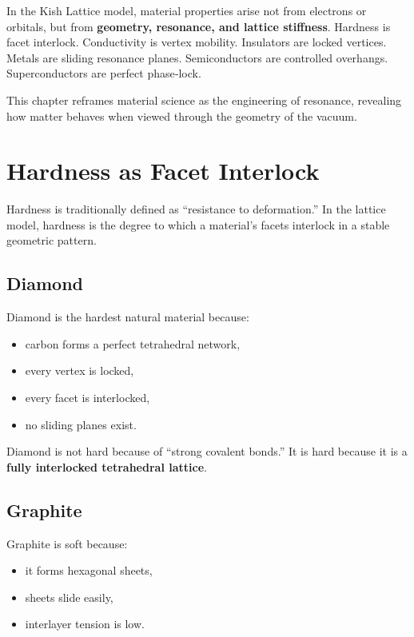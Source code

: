 \documentclass[11pt, letterpaper, openany]{book}
\begin{document}
In the Kish Lattice model, material properties arise not from electrons or orbitals, but from
\textbf{geometry, resonance, and lattice stiffness}. Hardness is facet interlock. Conductivity is
vertex mobility. Insulators are locked vertices. Metals are sliding resonance planes.
Semiconductors are controlled overhangs. Superconductors are perfect phase‑lock.

This chapter reframes material science as the engineering of resonance, revealing how
matter behaves when viewed through the geometry of the vacuum.

\section{Hardness as Facet Interlock}

Hardness is traditionally defined as “resistance to deformation.” In the lattice model,
hardness is the degree to which a material’s facets interlock in a stable geometric pattern.

\subsection*{Diamond}

Diamond is the hardest natural material because:

\begin{itemize}
    \item carbon forms a perfect tetrahedral network,
    \item every vertex is locked,
    \item every facet is interlocked,
    \item no sliding planes exist.
\end{itemize}

Diamond is not hard because of “strong covalent bonds.”  
It is hard because it is a \textbf{fully interlocked tetrahedral lattice}.

\subsection*{Graphite}

Graphite is soft because:

\begin{itemize}
    \item it forms hexagonal sheets,
    \item sheets slide easily,
    \item interlayer tension is low.
\end{itemize}
\end{document}
